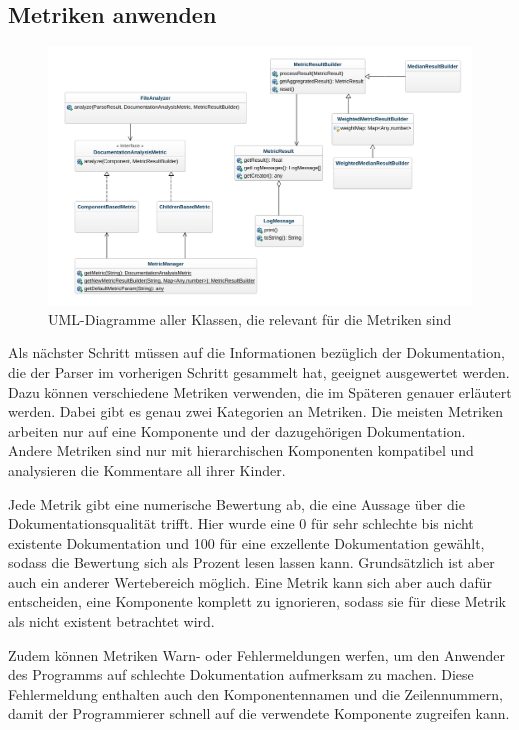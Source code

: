\subsection{Metriken anwenden}
\begin{figure}
    \centering
    \includegraphics[width=\columnwidth]{figures/uml/metriken.png}
    \caption{UML-Diagramme aller Klassen, die relevant für die Metriken sind}
    \label{fig:uml_metrics}
\end{figure}
Als nächster Schritt müssen auf die Informationen bezüglich der Dokumentation, die der Parser im vorherigen Schritt gesammelt hat, geeignet ausgewertet werden. Dazu können verschiedene Metriken verwenden, die im Späteren genauer erläutert werden. Dabei gibt es genau zwei Kategorien an Metriken. Die meisten Metriken arbeiten nur auf eine Komponente und der dazugehörigen Dokumentation. Andere Metriken sind nur mit hierarchischen Komponenten kompatibel und analysieren die Kommentare all ihrer Kinder. 

Jede Metrik gibt eine numerische Bewertung ab, die eine Aussage über die Dokumentationsqualität trifft. Hier wurde eine 0 für sehr schlechte bis nicht existente Dokumentation und 100 für eine exzellente Dokumentation gewählt, sodass die Bewertung sich als Prozent lesen lassen kann. Grundsätzlich ist aber auch ein anderer Wertebereich möglich. Eine Metrik kann sich aber auch dafür entscheiden, eine Komponente komplett zu ignorieren, sodass sie für diese Metrik als nicht existent betrachtet wird.

Zudem können Metriken Warn- oder Fehlermeldungen werfen, um den Anwender des Programms auf schlechte Dokumentation aufmerksam zu machen. Diese Fehlermeldung enthalten auch den Komponentennamen und die Zeilennummern, damit der Programmierer schnell auf die verwendete Komponente zugreifen kann.\bigskip

